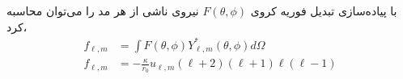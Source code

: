با پیاده‌سازی تبدیل فوریه کروی 
$F(\theta,\phi)$
نیروی ناشی از هر مد را می‌توان محاسبه کرد،
\begin{equation}
\begin{aligned}
f_{\ell,m}&=\int F(\theta,\phi)Y_{\ell,m}^*(\theta,\phi)d\Omega\\
f_{\ell,m}&=-\frac{\kappa}{r_0}u_{\ell,m}(\ell+2)(\ell+1)\ell(\ell-1)
\label{eq:normal_force_lm}
\end{aligned}
\end{equation}

















